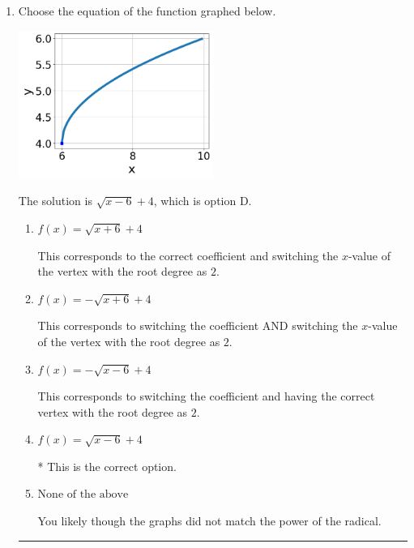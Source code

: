 \documentclass{extbook}[14pt]
\newcommand{\litem}[1]{\item #1

\rule{\textwidth}{0.4pt}}
\begin{document}
\begin{enumerate}\litem{
Choose the equation of the function graphed below.

\begin{center}
    \includegraphics[width=0.5\textwidth]{../Figures/radicalGraphToEquationCopyB.png}
\end{center}


The solution is \( \sqrt{x - 6} + 4 \), which is option D.\begin{enumerate}[label=\Alph*.]
\item \( f(x) = \sqrt{x + 6} + 4 \)

This corresponds to the correct coefficient and switching the $x$-value of the vertex with the root degree as $2$.
\item \( f(x) = - \sqrt{x + 6} + 4 \)

This corresponds to switching the coefficient AND switching the $x$-value of the vertex with the root degree as $2$.
\item \( f(x) = - \sqrt{x - 6} + 4 \)

This corresponds to switching the coefficient and having the correct vertex with the root degree as $2$.
\item \( f(x) = \sqrt{x - 6} + 4 \)

* This is the correct option.
\item \( \text{None of the above} \)

You likely though the graphs did not match the power of the radical.
\end{enumerate}

}
\end{enumerate}
\end{document}
